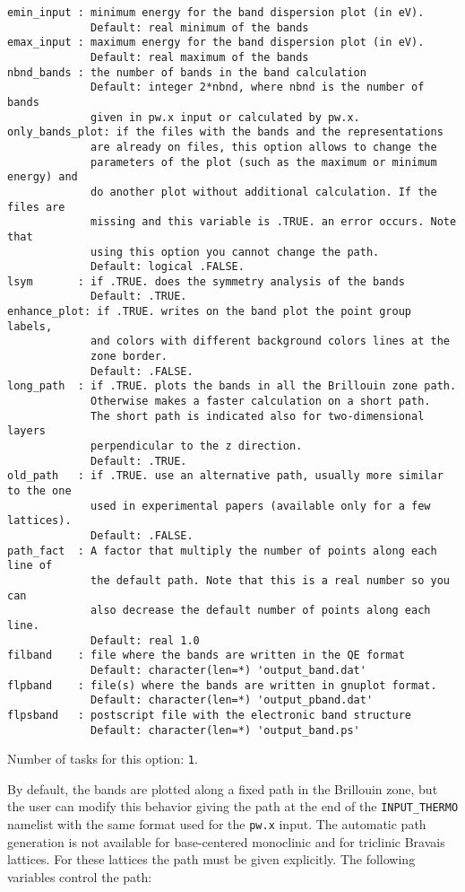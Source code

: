 \documentclass[12pt,a4paper]{article}
\begin{document}
\begin{verbatim}
emin_input : minimum energy for the band dispersion plot (in eV).
             Default: real minimum of the bands
emax_input : maximum energy for the band dispersion plot (in eV).
             Default: real maximum of the bands
nbnd_bands : the number of bands in the band calculation
             Default: integer 2*nbnd, where nbnd is the number of bands 
             given in pw.x input or calculated by pw.x.
only_bands_plot: if the files with the bands and the representations
             are already on files, this option allows to change the 
             parameters of the plot (such as the maximum or minimum energy) and
             do another plot without additional calculation. If the files are
             missing and this variable is .TRUE. an error occurs. Note that
             using this option you cannot change the path.
             Default: logical .FALSE.
lsym       : if .TRUE. does the symmetry analysis of the bands
             Default: .TRUE.
enhance_plot: if .TRUE. writes on the band plot the point group labels,
             and colors with different background colors lines at the 
             zone border.
             Default: .FALSE.
long_path  : if .TRUE. plots the bands in all the Brillouin zone path. 
             Otherwise makes a faster calculation on a short path. 
             The short path is indicated also for two-dimensional layers 
             perpendicular to the z direction.
             Default: .TRUE.
old_path   : if .TRUE. use an alternative path, usually more similar to the one
             used in experimental papers (available only for a few lattices).
             Default: .FALSE.
path_fact  : A factor that multiply the number of points along each line of 
             the default path. Note that this is a real number so you can 
             also decrease the default number of points along each line.
             Default: real 1.0
filband    : file where the bands are written in the QE format
             Default: character(len=*) 'output_band.dat'
flpband    : file(s) where the bands are written in gnuplot format.
             Default: character(len=*) 'output_pband.dat'
flpsband   : postscript file with the electronic band structure
             Default: character(len=*) 'output_band.ps'
\end{verbatim}
Number of tasks for this option: \texttt{1}.

By default, the bands are plotted along a fixed path in the Brillouin
zone, but the user can modify this behavior giving the path at the end of 
the \texttt{INPUT\_THERMO} namelist with the same format used for 
the \texttt{pw.x} input. The automatic path generation is not available 
for base-centered monoclinic and for triclinic Bravais lattices. For these
lattices the path must be given explicitly.
The following variables control the path:
\end{document}
